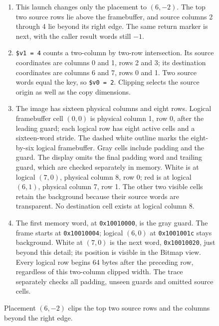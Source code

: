 \begin{figure}[htbp]
  \par\smallskip
  \begin{minipage}{\linewidth}
    \small
    \begin{enumerate}
      \setlength{\itemsep}{2pt}
            \setlength{\parsep}{0pt}
      \item This launch changes only the placement to $(6,-2)$. The top two source rows lie above the framebuffer, and source columns 2 through 4 lie beyond its right edge. The same return marker is next, with the caller result words still $-1$.
      \item \texttt{\$v1 = 4} counts a two-column by two-row intersection. Its source coordinates are columns 0 and 1, rows 2 and 3; its destination coordinates are columns 6 and 7, rows 0 and 1. Two source words equal the key, so \texttt{\$v0 = 2}. Clipping selects the source origin as well as the copy dimensions.
      \item The image has sixteen physical columns and eight rows. Logical framebuffer cell $(0,0)$ is physical column 1, row 0, after the leading guard; each logical row has eight active cells and a sixteen-word stride. The dashed white outline marks the eight-by-six logical framebuffer. Gray cells include padding and the guard. The display omits the final padding word and trailing guard, which are checked separately in memory. White is at logical $(7,0)$, physical column 8, row 0; red is at logical $(6,1)$, physical column 7, row 1. The other two visible cells retain the background because their source words are transparent. No destination cell exists at logical column 8.
      \item The first memory word, at \texttt{0x10010000}, is the gray guard. The frame starts at \texttt{0x10010004}; logical $(6,0)$ at \texttt{0x1001001c} stays background. White at $(7,0)$ is the next word, \texttt{0x10010020}, just beyond this detail; its position is visible in the Bitmap view. Every logical row begins 64 bytes after the preceding row, regardless of this two-column clipped width. The trace separately checks all padding, unseen guards and omitted source cells.
    \end{enumerate}
  \end{minipage}
  \caption{Placement $(6,-2)$ clips the top two source rows and the columns beyond the right edge.}
  \label{capture:016-clipped-sprite-blitter-f03}
  \label{blit-f03}
\end{figure}
\par
